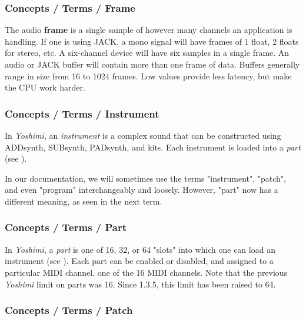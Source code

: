 \subsubsection{Concepts / Terms / Frame}
\label{subsubsec:concepts_terms_frame}

   The audio \textbf{frame}
   is a single sample of however many channels an application is handling.
   If one is using JACK, a mono signal will have frames of 1 float, 2 floats
   for stereo, etc.  A six-channel device will have six samples in a single
   frame.  An audio or JACK buffer will contain more than one frame of data.
   Buffers generally range in size from 16 to 1024 frames.  Low values provide
   less latency, but make the CPU work harder.

\subsubsection{Concepts / Terms / Instrument}
\label{subsubsec:concepts_terms_instrument}

   In \textsl{Yoshimi}, an \textsl{instrument} is a complex sound that can
   be constructed using ADDsynth, SUBsynth, PADsynth, and kits.
   Each instrument is loaded into a \textsl{part}
   (see ).

   In our documentation, we will sometimes use the terms "instrument",
   "patch", and even "program" interchangeably and loosely.
   However, "part" now has a different meaning, as seen in the next term.

\subsubsection{Concepts / Terms / Part}
\label{subsubsec:concepts_terms_part}

   In \textsl{Yoshimi}, a \textsl{part} is one of 16, 32, or
   64 "slots" into which one can load an instrument (see
   ).  Each part can be
   enabled or disabled, and assigned to a particular MIDI channel, one of
   the 16 MIDI channels.
   Note that the previous \textsl{Yoshimi} limit on parts was 16.
   Since 1.3.5, this limit has been raised to 64.

\subsubsection{Concepts / Terms / Patch}
\label{subsubsec:concepts_terms_patch}

